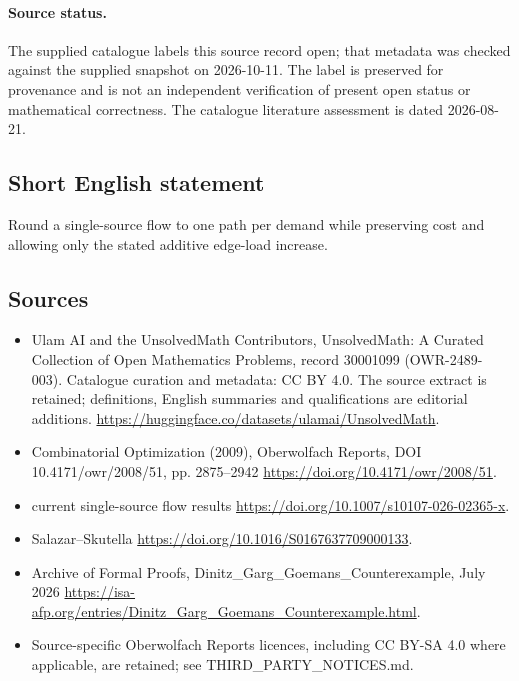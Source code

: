 \documentclass[11pt]{article}
\begin{document}
\paragraph{Source status.}
The supplied catalogue labels this source record open; that metadata was checked against the supplied snapshot on 2026-10-11. The label is preserved for provenance and is not an independent verification of present open status or mathematical correctness. The catalogue literature assessment is dated 2026-08-21.
\subsection{Short English statement}
Round a single-source flow to one path per demand while preserving cost and allowing only the stated additive edge-load increase.
\subsection{Sources}
\begin{itemize}
\item[\hypertarget{source:30001099:1}{S1}] Ulam AI and the UnsolvedMath Contributors, UnsolvedMath: A Curated Collection of Open Mathematics Problems, record 30001099 (OWR-2489-003). Catalogue curation and metadata: CC BY 4.0. The source extract is retained; definitions, English summaries and qualifications are editorial additions.
\url{https://huggingface.co/datasets/ulamai/UnsolvedMath}.
\item[\hypertarget{source:30001099:2}{S2}] Combinatorial Optimization (2009), Oberwolfach Reports, DOI 10.4171/owr/2008/51, pp. 2875--2942
\url{https://doi.org/10.4171/owr/2008/51}.
\item[\hypertarget{source:30001099:3}{S3}] current single-source flow results
\url{https://doi.org/10.1007/s10107-026-02365-x}.
\item[\hypertarget{source:30001099:4}{S4}] Salazar--Skutella
\url{https://doi.org/10.1016/S0167637709000133}.
\item[\hypertarget{source:30001099:5}{S5}] Archive of Formal Proofs, Dinitz\_Garg\_Goemans\_Counterexample, July 2026
\url{https://isa-afp.org/entries/Dinitz_Garg_Goemans_Counterexample.html}.
\item Source-specific Oberwolfach Reports licences, including CC BY-SA 4.0 where applicable, are retained; see THIRD\_PARTY\_NOTICES.md.
\end{itemize}
\end{document}
